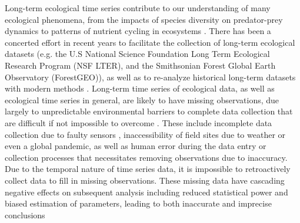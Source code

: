 \documentclass{article}
\begin{document}
\begin{linenumbers}
Long-term ecological time series contribute to our understanding of many ecological phenomena, from the impacts of species diversity on predator-prey dynamics to patterns of nutrient cycling in ecosystems \citep{Hughes2017, Likens1970, Sinclair2003}. There has been a concerted effort in recent years to facilitate the collection of long-term ecological datasets (e.g. the U.S National Science Foundation Long Term Ecological Research Program (NSF LTER), and the Smithsonian Forest Global Earth Observatory (ForestGEO)), as well as to re-analyze historical long-term datasets with modern methods \citep{Adler2009, Buma2017}. Long-term time series of ecological data, as well as ecological time series in general, are likely to have missing observations, due largely to unpredictable environmental barriers to complete data collection that are difficult if not impossible to overcome \citep{lopucki2022handling, nakagawa_missing_2008}. These include incomplete data collection due to faulty sensors \citep{hossie_confronting_2021}, inaccessibility of field sites due to weather or even a global pandemic, as well as human error during the data entry or collection processes that necessitates removing observations due to inaccuracy. Due to the temporal nature of time series data, it is impossible to retroactively collect data to fill in missing observations. These missing data have cascading negative effects on subsequent analysis including reduced statistical power \citep{kang2013prevention, moritz_imputets_2017} and biased estimation of parameters, leading to both inaccurate and imprecise conclusions \citep{aleryani2018dealing, kim_transcending_2018, junger_imputation_2015}


\end{linenumbers}
\end{document}
